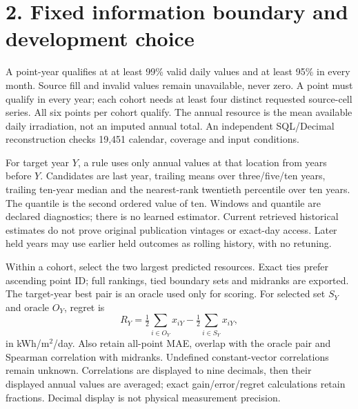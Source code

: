 \documentclass[10pt,letterpaper]{article}
\begin{document}
\section*{2. Fixed information boundary and development choice}
A point-year qualifies at at least 99\% valid daily values and at least 95\% in every month. Source fill and invalid values remain unavailable, never zero. A point must qualify in every year; each cohort needs at least four distinct requested source-cell series. All six points per cohort qualify. The annual resource is the mean available daily irradiation, not an imputed annual total. An independent SQL/Decimal reconstruction checks 19,451 calendar, coverage and input conditions.

For target year $Y$, a rule uses only annual values at that location from years before $Y$. Candidates are last year, trailing means over three/five/ten years, trailing ten-year median and the nearest-rank twentieth percentile over ten years. The quantile is the second ordered value of ten. Windows and quantile are declared diagnostics; there is no learned estimator. Current retrieved historical estimates do not prove original publication vintages or exact-day access. Later held years may use earlier held outcomes as rolling history, with no retuning.

Within a cohort, select the two largest predicted resources. Exact ties prefer ascending point ID; full rankings, tied boundary sets and midranks are exported. The target-year best pair is an oracle used only for scoring. For selected set $S_Y$ and oracle $O_Y$, regret is
\[
 R_Y=\tfrac12\sum_{i\in O_Y}x_{iY}-\tfrac12\sum_{i\in S_Y}x_{iY},
\]
in kWh/m$^2$/day. Also retain all-point MAE, overlap with the oracle pair and Spearman correlation with midranks. Undefined constant-vector correlations remain unknown. Correlations are displayed to nine decimals, then their displayed annual values are averaged; exact gain/error/regret calculations retain fractions. Decimal display is not physical measurement precision.
\end{document}
